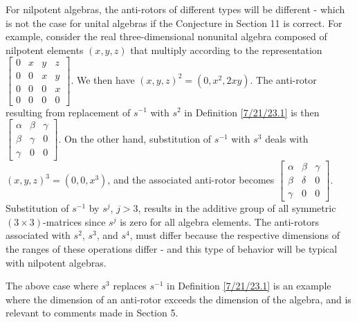 \documentclass{amsart}
\numberwithin{equation}{section}
\theoremstyle{definition}
\numberwithin{theorem}{section}
\begin{document}
For nilpotent algebras, the anti-rotors of different types will be different - which is not the case for unital algebras if the Conjecture in Section 11 is correct.  For example, consider the real three-dimensional nonunital algebra composed of nilpotent elements $(x,y,z)$ that multiply according to the representation
  $ \left[
\begin{array}{ccccc}
0 & x & y & z  \\
0 & 0 & x & y \\
0 & 0 & 0 & x \\
0 & 0 & 0 & 0
\end{array}
\right] $.  We then have $(x,y,z)^2 = (0,x^2, 2xy)$.  The anti-rotor resulting from replacement of $s^{-1}$ with  $s^2$ in Definition \ref{7/21/23.1} is then $\left[
\begin{array}{ccccc}
\alpha & \beta & \gamma   \\
\beta & \gamma & 0 \\
\gamma & 0 & 0  
\end{array}
\right] $.  On the other hand, substitution of $s^{-1}$ with $s^3$  deals with $(x,y,z)^3 = (0,0, x^3)$, and the associated anti-rotor becomes $\left[
\begin{array}{ccccc}
\alpha & \beta & \gamma   \\
\beta & \delta & 0 \\
\gamma & 0 & 0  
\end{array}
\right] $.  Substitution of $s^{-1}$ by $s^j$, $j>3$, results in the additive group of all symmetric $(3\times 3)$-matrices since $s^j$ is zero for all algebra elements.  The anti-rotors associated with $s^2$, $s^3$, and $s^4$, must differ because the respective dimensions of the ranges of these operations differ - and this type of behavior will be typical with nilpotent algebras.  
 
The above case where $s^3$ replaces $s^{-1}$ in Definition \ref{7/21/23.1} is an example where the dimension of an anti-rotor exceeds the dimension of the algebra, and is relevant to comments made in Section 5.
\end{document}
